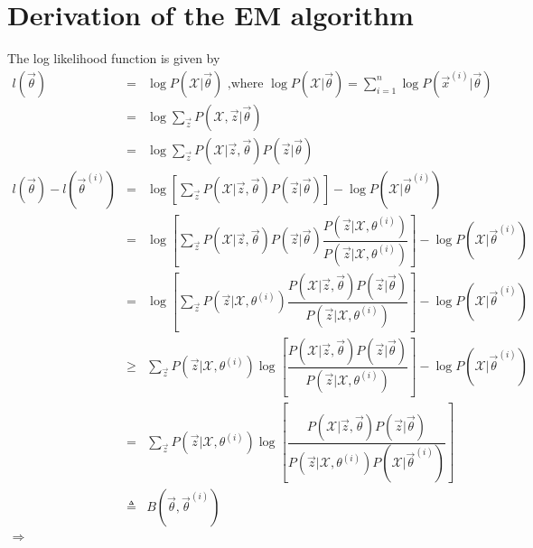 \section{Derivation of the EM algorithm}
The log likelihood function is given by 
\begin{eqnarray}
l(\vec{\theta}) &=& \log{P(\mathcal{X}|\vec{\theta})} \text{ ,where } \log{P(\mathcal{X}|\vec{\theta})}=\sum\limits_{i=1}^{n} \log{{P(\vec{x}^{(i)}|\vec{\theta})}}\nonumber \\
                &=& \log{{\sum\limits_{\vec{z}} P(\mathcal{X},\vec{z}|\vec{\theta})}} \nonumber \\
				&=& \log{{\sum\limits_{\vec{z}} P(\mathcal{X}|\vec{z},\vec{\theta})P(\vec{z}|\vec{\theta})}} \nonumber \\
l(\vec{\theta})-l(\vec{\theta}^{(i)}) &=& \log\left[\sum\limits_{\vec{z}} P(\mathcal{X}|\vec{z},\vec{\theta})P(\vec{z}|\vec{\theta})\right] - \log{P(\mathcal{X}|\vec{\theta}^{(i)})} \nonumber \\
                &=& \log\left[\sum\limits_{\vec{z}} P(\mathcal{X}|\vec{z},\vec{\theta})P(\vec{z}|\vec{\theta})\dfrac{P(\vec{z}|\mathcal{X},\theta^{(i)})}{P(\vec{z}|\mathcal{X},\theta^{(i)})}\right] - \log{P(\mathcal{X}|\vec{\theta}^{(i)})} \nonumber \\
				&=& \log\left[\sum\limits_{\vec{z}} P(\vec{z}|\mathcal{X},\theta^{(i)})\dfrac{P(\mathcal{X}|\vec{z},\vec{\theta})P(\vec{z}|\vec{\theta})}{P(\vec{z}|\mathcal{X},\theta^{(i)})}\right] - \log{P(\mathcal{X}|\vec{\theta}^{(i)})} \nonumber \\
				&\geq& \sum\limits_{\vec{z}} P(\vec{z}|\mathcal{X},\theta^{(i)})\log\left[\dfrac{P(\mathcal{X}|\vec{z},\vec{\theta})P(\vec{z}|\vec{\theta})}{P(\vec{z}|\mathcal{X},\theta^{(i)})}\right] - \log{P(\mathcal{X}|\vec{\theta}^{(i)})} \nonumber \\
				&=& \sum\limits_{\vec{z}} P(\vec{z}|\mathcal{X},\theta^{(i)})\log\left[\dfrac{P(\mathcal{X}|\vec{z},\vec{\theta})P(\vec{z}|\vec{\theta})}{P(\vec{z}|\mathcal{X},\theta^{(i)})P(\mathcal{X}|\vec{\theta}^{(i)})}\right] \nonumber \\
				&\triangleq& B(\vec{\theta},\vec{\theta}^{(i)}) \nonumber \\
\Rightarrow \nonumber
\end{eqnarray}

